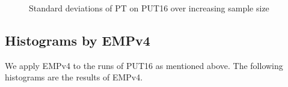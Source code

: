 \documentclass[10pt]{article}
\begin{document}
\begin{figure}[h]
	\centering
	\caption{Standard deviations of PT on PUT16 over increasing sample size~\label{fig:put16_std_ss_plot}}
\end{figure}

\clearpage
\newpage

\subsection{Histograms by EMPv4~\label{sec:put16_empv4}}
We apply EMPv4 to the runs of PUT16 as mentioned above.
The following histograms are the results of EMPv4.
\end{document}
